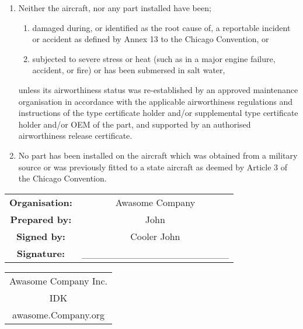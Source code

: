 \documentclass{article}
\begin{document}
 \begin{enumerate}
     \item Neither the aircraft, nor any part installed have been;
     \begin{enumerate}
         \item damaged during, or identified as the root cause of, a reportable incident or accident as defined by Annex 13 to the Chicago Convention, or
         \item subjected to severe stress or heat (such as in a major engine failure, accident, or fire) or has been submersed in salt water,
     \end{enumerate}
     unless its airworthiness status was re-established by an approved maintenance organisation in accordance with the applicable airworthiness regulations and instructions of the type certificate holder and/or supplemental type certificate holder and/or OEM of the part, and supported by an authorised airworthiness release certificate.

     \item No part has been installed on the aircraft which was obtained from a military source or was previously fitted to a state aircraft as deemed by Article 3 of the Chicago Convention.
 \end{enumerate}

\vspace{20pt}

 \begin{tabular}{c c}

      \textbf{Organisation:} & Awasome Company\\
      \textbf{Prepared by: } & John \\
      \textbf{Signed by: } & Cooler John \\
      \textbf{Signature: } & \_\_\_\_\_\_\_\_\_\_\_\_\_\_\_\_\_\_\_\_\_ \\
 \end{tabular}

\vspace{20pt}

\begin{tabular}{c}
     Awasome Company Inc. \\
     IDK \\
     awasome.Company.org
\end{tabular}
\end{document}
